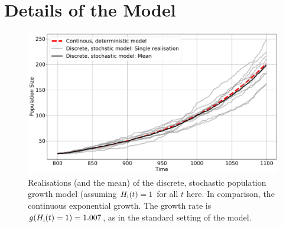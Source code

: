 
\chapter{Details of the Model} \label{sec:APPpopgrowth}

\begin{figure}
	\centering
	\includegraphics[width=\textwidth]{images/RealisationsOfPopGrowth.pdf}
	\caption{Realisations (and the mean) of the discrete, stochastic population growth model (assuming $H_{\rm i}(t) = 1$ for all $t$ here. In comparison, the continuous exponential growth. The growth rate is $g(H_{\rm i}(t)=1)=1.007$, as in the standard setting of the model.}
	\label{fig:realisationsofpopgrowth}
\end{figure}
